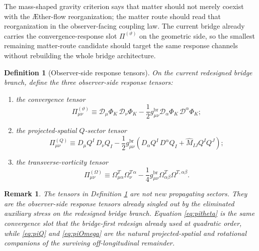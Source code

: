 \documentclass[11pt]{article}
\newcommand{\Aflow}{\AE{}ther-flow}
\newcommand{\Dperp}{\mathcal D}
\newcommand{\PiTheta}{\Pi^{(\vartheta)}}
\newcommand{\PiQ}{\Pi^{(Q)}}
\newcommand{\PiOmega}{\Pi^{(\Omega)}}
\newtheorem{definition}{Definition}
\newtheorem{remark}{Remark}
\begin{document}
The mass-shaped gravity criterion says that matter should not merely coexist with the \Aflow{} reorganization; the matter route should read that reorganization in the observer-facing coupling law. The current bridge already carries the convergence-response slot \(\PiTheta\) on the geometric side, so the smallest remaining matter-route candidate should target the same response channels without rebuilding the whole bridge architecture.

\begin{definition}[Observer-side response tensors]
\label{def:responses}
On the current redesigned bridge branch, define the three observer-side response tensors:
\begin{enumerate}
    \item the convergence tensor
    \begin{equation}
    \PiTheta_{\mu\nu}
    \equiv
    \Dperp_\mu\Phi_K\,\Dperp_\nu\Phi_K
    -\frac12 g_{\mu\nu}^{\mathrm{br}}\Dperp_\alpha\Phi_K\,\Dperp^\alpha\Phi_K;
    \label{eq:pitheta}
    \end{equation}
    \item the projected-spatial \(Q\)-sector tensor
    \begin{equation}
    \PiQ_{\mu\nu}
    \equiv
    D_\mu Q^I\,D_\nu Q_I
    -\frac12 g_{\mu\nu}^{\mathrm{br}}
    \left(
    D_\alpha Q^I\,D^\alpha Q_I+\widehat M_{IJ}Q^IQ^J
    \right);
    \label{eq:piQ}
    \end{equation}
    \item the transverse-vorticity tensor
    \begin{equation}
    \PiOmega_{\mu\nu}
    \equiv
    \Omega_{\mu\alpha}^T\Omega_\nu^{T\,\alpha}
    -\frac14 g_{\mu\nu}^{\mathrm{br}}\Omega_{\alpha\beta}^T\Omega^{T,\alpha\beta}.
    \label{eq:piOmega}
    \end{equation}
\end{enumerate}
\end{definition}

\begin{remark}
The tensors in Definition \ref{def:responses} are not new propagating sectors. They are the observer-side response tensors already singled out by the eliminated auxiliary stress on the redesigned bridge branch. Equation \eqref{eq:pitheta} is the same convergence slot that the bridge-first redesign already used at quadratic order, while \eqref{eq:piQ} and \eqref{eq:piOmega} are the natural projected-spatial and rotational companions of the surviving off-longitudinal remainder.
\end{remark}
\end{document}
